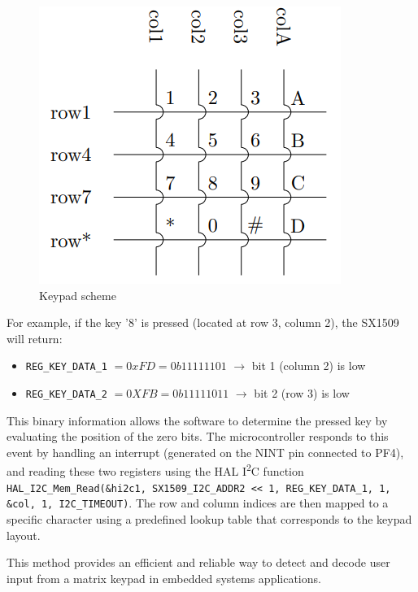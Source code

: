\begin{figure}[H]
    \centering
    \includegraphics[width=0.45\linewidth]{lab1-2/figures/keypad.png}
    \caption{Keypad scheme}
    \label{fig:keypad}
\end{figure}

\noindent
For example, if the key '8' is pressed (located at row 3, column 2), the SX1509 will return: 

\begin{itemize}
    \item \texttt{REG\_KEY\_DATA\_1} $ =0xFD=0b11111101$ $\rightarrow$ bit 1 (column 2) is low 
    \item \texttt{REG\_KEY\_DATA\_2} $=0XFB=0b11111011$ $\rightarrow$ bit 2 (row 3) is low 
\end{itemize}

\noindent
This binary information allows the software to determine the pressed key by evaluating the position of the zero bits. The microcontroller responds to this event by handling an interrupt (generated on the NINT pin connected to PF4), and reading these two registers using the HAL I\textsuperscript{2}C function \texttt{HAL\_I2C\_Mem\_Read(\&hi2c1, SX1509\_I2C\_ADDR2 << 1, REG\_KEY\_DATA\_1, 1, \&col, 1, I2C\_TIMEOUT)}. The row and column indices are then mapped to a specific character using a predefined lookup table that corresponds to the keypad layout. 

\noindent
This method provides an efficient and reliable way to detect and decode user input from a matrix keypad in embedded systems applications.


